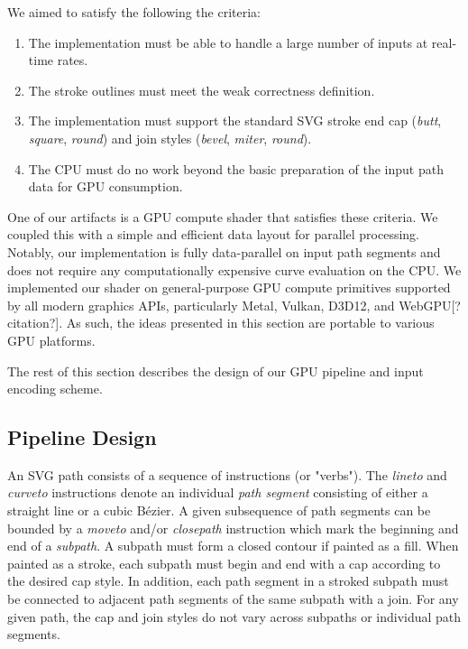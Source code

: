 \documentclass[sigconf, authordraft]{acmart}
\begin{document}
We aimed to satisfy the following the criteria:
\begin{enumerate}
  \item The implementation must be able to handle a large number of inputs at real-time rates. 
  \item The stroke outlines must meet the weak correctness definition.
  \item The implementation must support the standard SVG stroke end cap (\emph{butt}, \emph{square}, \emph{round}) and join styles (\emph{bevel}, \emph{miter}, \emph{round}).
  \item The CPU must do no work beyond the basic preparation of the input path data for GPU consumption.
\end{enumerate}

One of our artifacts is a GPU compute shader that satisfies these criteria. We coupled this with a simple and efficient data layout for parallel processing. Notably, our implementation is fully data-parallel on input path segments and does not require any computationally expensive curve evaluation on the CPU. We implemented our shader on general-purpose GPU compute primitives supported by all modern graphics APIs, particularly Metal, Vulkan, D3D12, and WebGPU[? citation?]. As such, the ideas presented in this section are portable to various GPU platforms.

The rest of this section describes the design of our GPU pipeline and input encoding scheme.


\subsection{Pipeline Design} \label{subsec:pipeline-design}

An SVG path consists of a sequence of instructions (or "verbs"). The \emph{lineto} and \emph{curveto} instructions denote an individual \emph{path segment} consisting of either a straight line or a cubic Bézier. A given subsequence of path segments can be bounded by a \emph{moveto} and/or \emph{closepath} instruction which mark the beginning and end of a \emph{subpath}. A subpath must form a closed contour if painted as a fill. When painted as a stroke, each subpath must begin and end with a cap according to the desired cap style. In addition, each path segment in a stroked subpath must be connected to adjacent path segments of the same subpath with a join. For any given path, the cap and join styles do not vary across subpaths or individual path segments.
\end{document}
